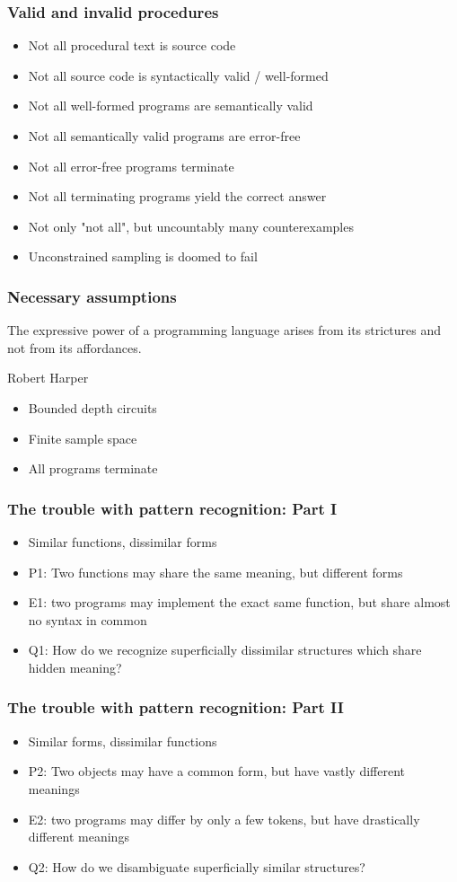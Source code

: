 \documentclass{beamer}
\begin{document}
\begin{frame}
  \frametitle{Valid and invalid procedures}
  \begin{itemize}
    \item Not all procedural text is source code
    \item Not all source code is syntactically valid / well-formed
    \item Not all well-formed programs are semantically valid
    \item Not all semantically valid programs are error-free
    \item Not all error-free programs terminate
    \item Not all terminating programs yield the correct answer
    \item Not only "not all", but uncountably many counterexamples
    \item Unconstrained sampling is doomed to fail
  \end{itemize}
\end{frame}

\begin{frame}
  \frametitle{Necessary assumptions}
  \setlength{\epigraphwidth}{0.5\textwidth}
  \epigraph{The expressive power of a programming language arises from its strictures and not from its affordances.}{Robert Harper}
  \begin{itemize}
    \item Bounded depth circuits
    \item Finite sample space
    \item All programs terminate
  \end{itemize}
\end{frame}

\begin{frame}
  \frametitle{The trouble with pattern recognition: Part I}
  \begin{itemize}
    \item Similar functions, dissimilar forms
    \item P1: Two functions may share the same meaning, but different forms
    \item E1: two programs may implement the exact same function, but share almost no syntax in common
    \item Q1: How do we recognize superficially dissimilar structures which share hidden meaning?
  \end{itemize}
\end{frame}

\begin{frame}
  \frametitle{The trouble with pattern recognition: Part II}
  \begin{itemize}
    \item Similar forms, dissimilar functions
    \item P2: Two objects may have a common form, but have vastly different meanings
    \item E2: two programs may differ by only a few tokens, but have drastically different meanings
    \item Q2: How do we disambiguate superficially similar structures?
  \end{itemize}
\end{frame}
\end{document}

